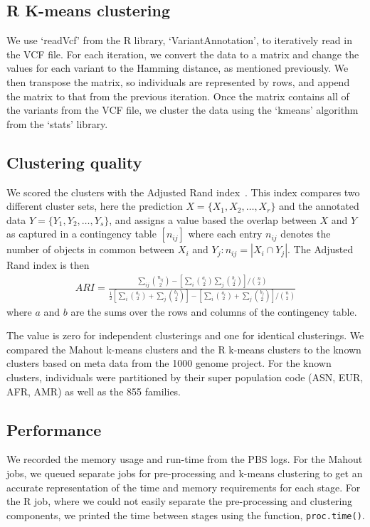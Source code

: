 \documentclass{bioinfo}
\begin{document}
\begin{methods}
\subsection*{R K-means clustering}
We use `readVcf' from the R library, `VariantAnnotation', to iteratively read in the VCF file. For each iteration, we convert the data to a matrix and
change the values for each variant to the Hamming distance, as mentioned previously. We then transpose the matrix, so individuals are represented
by rows, and append the matrix to that from the previous iteration. Once the matrix contains all of the variants from the VCF file, we cluster the data
using the `kmeans' algorithm from the `stats' library.



\subsection*{Clustering quality}
We scored the clusters with the Adjusted Rand index~\cite{Hubert1985}. 
This index compares two different cluster sets, here the prediction $X = \{ X_1, X_2, \ldots , X_r \}$ and the annotated data $Y = \{ Y_1, Y_2, \ldots , Y_s \}$, and assigns a value based the overlap between $X$ and $Y$ as captured in a contingency table $\left[n_{ij}\right]$ where each entry $n_{ij}$ denotes the number of objects in common between $X_i$ and $Y_j : n_{ij}=|X_i \cap Y_j|$. 
The Adjusted Rand index is then 
{\tiny
\begin{eqnarray*}
ARI=\frac{\sum_{ij}{{n_{ij}\choose 2}} - \left[ \sum_{i}{{a_i\choose2}} \sum_{j}{{b_i\choose2}} \right] / {n\choose2}}{\frac{1}{2} \left[ \sum_{i}{{a_{i}\choose 2} + \sum_{j}{{b_{j}\choose 2}}} \right] - \left[ \sum_{i}{{a_{i}\choose 2} + \sum_{j}{{b_{j}\choose 2}}} \right] / {n\choose2}} 
\end{eqnarray*}
}
where $a$ and $b$ are the sums over the rows and columns of the contingency table.

The value is zero for independent clusterings and one for identical clusterings. 
We compared the Mahout k-means
clusters and the R k-means clusters to the known clusters based on meta data from the 1000 genome project. For the known clusters,
individuals were partitioned by their super population code (ASN, EUR, AFR, AMR) as well as the 855 families.



\subsection*{Performance}
We recorded the memory usage and run-time from the PBS logs. For the Mahout jobs, we queued separate jobs
for pre-processing and k-means clustering to get an accurate representation of the time and memory requirements for each stage.
For the R job, where we could not easily separate the pre-processing and clustering components, we printed the time between
stages using the function, \texttt{proc.time()}.

\end{methods}
\end{document}
